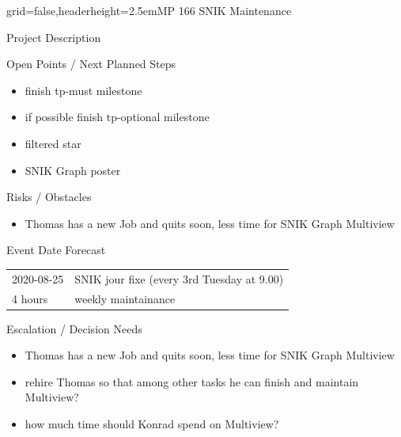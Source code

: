 \documentclass[english]{kiesgrube}
\begin{document}
\begin{poster}{grid=false,headerheight=2.5em}{}{MP 166 SNIK Maintenance}{}{}
\begin{posterbox}[name=description,column=1,row=0]{Project Description}
\end{posterbox}
\begin{posterbox}[name=open,column=1,below=description]{Open Points / Next Planned Steps}
\begin{itemize}
\item finish tp-must milestone
\item if possible finish tp-optional milestone
\item filtered star
\item SNIK Graph poster
\end{itemize}
\end{posterbox}
\begin{posterbox}[name=risks,column=1,below=open]{Risks / Obstacles}
\begin{itemize}
\item Thomas has a new Job and quits soon, less time for SNIK Graph Multiview
\end{itemize}
\end{posterbox}
\begin{posterbox}[name=event,column=1,below=open]{Event Date Forecast}
\begin{tabulary}{\textwidth}{lL}
2020-08-25	&SNIK jour fixe	(every 3rd Tuesday at 9.00)\\
4 hours		&weekly maintainance\\
\end{tabulary}
\end{posterbox}
\begin{posterbox}[name=escalation,column=1,below=event]{Escalation / Decision Needs}
\begin{itemize}
\item Thomas has a new Job and quits soon, less time for SNIK Graph Multiview
\item rehire Thomas so that among other tasks he can finish and maintain Multiview?
\item how much time should Konrad spend on Multiview?
\end{itemize}
\end{posterbox}
\footer
\end{poster}
\end{document}
